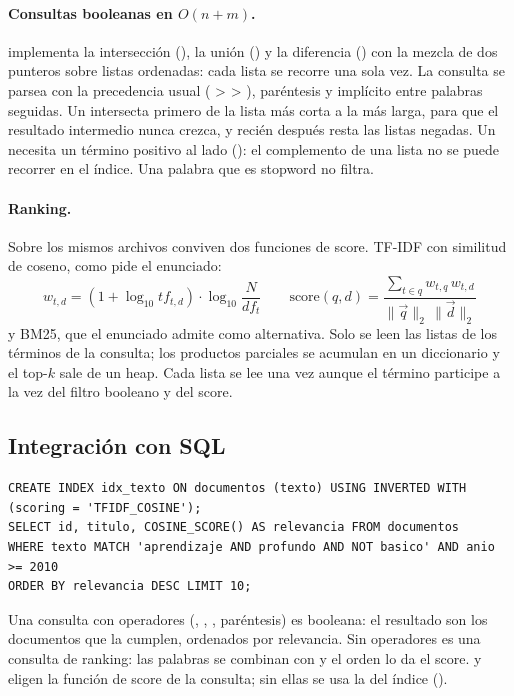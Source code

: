 \paragraph{Consultas booleanas en $O(n+m)$.}  implementa la
intersección (), la unión () y la diferencia () con la
mezcla de dos punteros sobre listas ordenadas: cada lista se recorre una sola vez. La
consulta se parsea con la precedencia usual ( >  > ),
paréntesis y  implícito entre palabras seguidas. Un  intersecta primero
de la lista más corta a la más larga, para que el resultado intermedio nunca crezca, y
recién después resta las listas negadas. Un  necesita un término positivo al lado
(): el complemento de una lista no se puede recorrer en el índice. Una
palabra que es stopword no filtra.

\paragraph{Ranking.} Sobre los mismos archivos conviven dos funciones de score. TF-IDF con
similitud de coseno, como pide el enunciado:
\[
w_{t,d} = (1+\log_{10} tf_{t,d})\cdot\log_{10}\frac{N}{df_t}
\qquad
\text{score}(q,d)=\frac{\sum_{t\in q} w_{t,q}\,w_{t,d}}{\|\vec q\|_2\,\|\vec d\|_2}
\]
y BM25, que el enunciado admite como alternativa. Solo se leen las listas de los términos
de la consulta; los productos parciales se acumulan en un diccionario y el top-$k$ sale de
un heap. Cada lista se lee una vez aunque el término participe a la vez del filtro booleano
y del score.

\subsection{Integración con SQL}

\begin{lstlisting}
CREATE INDEX idx_texto ON documentos (texto) USING INVERTED WITH (scoring = 'TFIDF_COSINE');
SELECT id, titulo, COSINE_SCORE() AS relevancia FROM documentos
WHERE texto MATCH 'aprendizaje AND profundo AND NOT basico' AND anio >= 2010
ORDER BY relevancia DESC LIMIT 10;
\end{lstlisting}

Una consulta con operadores (, , , paréntesis) es booleana: el
resultado son los documentos que la cumplen, ordenados por relevancia. Sin operadores es
una consulta de ranking: las palabras se combinan con  y el orden lo da el score.
 y  eligen la función de score de la consulta; sin
ellas se usa la del índice ().

